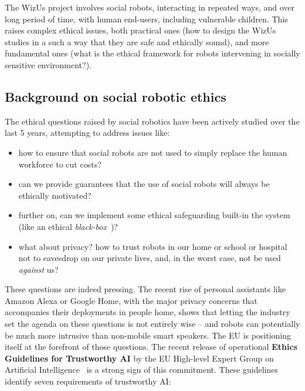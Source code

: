 \documentclass[11pt,a4paper]{report}
\newcommand{\project}{WizUs\xspace}
\begin{document}
The \project project involves social robots, interacting in repeated ways, and
over long period of time, with human end-users, including vulnerable children.
This raises complex ethical issues, both practical ones (how to design the
\project studies in a such a way that they are safe and ethically sound), and
more fundamental ones (what is the ethical framework for robots intervening in
socially sensitive environment?).


\subsection{Background on social robotic ethics}

The ethical questions raised by social robotics have been actively studied over
the last 5 years, attempting to address issues like:

\begin{itemize}
    \item how to ensure that social robots are not used to simply replace the human
        workforce to cut costs?
    \item can we provide guarantees that the use of social robots will always be
        ethically motivated?
    \item further on, can we implement some ethical safeguarding built-in
        the system (like an ethical \emph{black-box}~\cite{winfield2017case})?
    \item what about privacy? how to trust robots in our home or school or
        hospital not to eavesdrop on our private lives, and, in the worst
        case, not be used \emph{against} us?
\end{itemize}

These questions are indeed pressing. The recent rise of personal assistants like
Amazon Alexa or Google Home, with the major privacy concerns that accompanies
their deployments in people home, shows that letting the industry set the agenda
on these questions is not entirely wise -- and robots can potentially be much
more intrusive than non-mobile smart speakers.  The EU is positioning itself at
the forefront of those questions. The recent release of operational \textbf{Ethics
Guidelines for Trustworthy AI} by the EU High-level Expert Group on Artificial
Intelligence~\cite{eu2019ethics} is a strong sign of this commitment. These
guidelines identify seven requirements of trustworthy AI:
\end{document}
